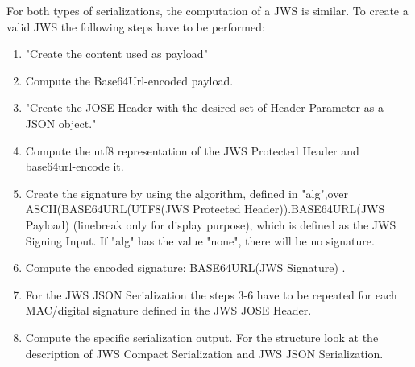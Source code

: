 For both types of serializations, the computation of a JWS is similar. To create a valid JWS the following steps have to be performed: 
\begin{enumerate}
\item "Create the content used as payload" \cite{rfc7515}
\item Compute the Base64Url-encoded payload. 
\item "Create the JOSE Header with the desired set of Header Parameter as a JSON object." \cite{rfc7515}
\item Compute the utf8 representation of the JWS Protected Header and base64url-encode it.
\item Create the signature by using the algorithm, defined in "alg",\newline over  ASCII(BASE64URL(UTF8(JWS Protected Header)).BASE64URL(JWS Payload) (linebreak only for display purpose), which is defined as the JWS Signing Input. If "alg" has the value "none", there will be no signature.
\item Compute the encoded signature: BASE64URL(JWS Signature) .
\item For the JWS JSON Serialization the steps 3-6 have to be repeated for each MAC/digital signature defined in the JWS JOSE Header.
\item Compute the specific serialization output. For the structure look at the description of JWS Compact Serialization and JWS JSON Serialization.
\end{enumerate} \cite{rfc7515}



